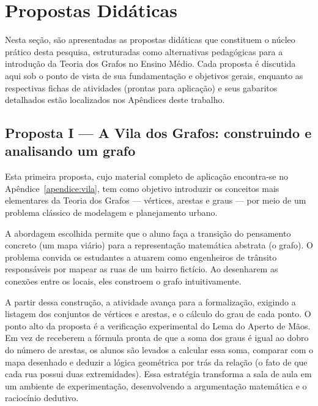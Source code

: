 \documentclass[
  12pt,
  oneside,
  a4paper,
  english,
  brazilian
  ]{abntex2}
\theoremstyle{definition}
\begin{document}
\section{Propostas Didáticas}
\label{sec:propostas_didaticas}

Nesta seção, são apresentadas as propostas didáticas que constituem o núcleo prático desta pesquisa, estruturadas como alternativas pedagógicas para a introdução da Teoria dos Grafos no Ensino Médio. Cada proposta é discutida aqui sob o ponto de vista de sua fundamentação e objetivos gerais, enquanto as respectivas fichas de atividades (prontas para aplicação) e seus gabaritos detalhados estão localizados nos Apêndices deste trabalho.

\subsection{Proposta I --- A Vila dos Grafos: construindo e analisando um grafo}
\label{sub:proposta_vila}

Esta primeira proposta, cujo material completo de aplicação encontra-se no Apêndice~\ref{apendice:vila}, tem como objetivo introduzir os conceitos mais elementares da Teoria dos Grafos --- vértices, arestas e graus --- por meio de um problema clássico de modelagem e planejamento urbano.

A abordagem escolhida permite que o aluno faça a transição do pensamento concreto (um mapa viário) para a representação matemática abstrata (o grafo). O problema convida os estudantes a atuarem como engenheiros de trânsito responsáveis por mapear as ruas de um bairro fictício. Ao desenharem as conexões entre os locais, eles constroem o grafo intuitivamente.

A partir dessa construção, a atividade avança para a formalização, exigindo a listagem dos conjuntos de vértices e arestas, e o cálculo do grau de cada ponto. O ponto alto da proposta é a verificação experimental do Lema do Aperto de Mãos. Em vez de receberem a fórmula pronta de que a soma dos graus é igual ao dobro do número de arestas, os alunos são levados a calcular essa soma, comparar com o mapa desenhado e deduzir a lógica geométrica por trás da relação (o fato de que cada rua possui duas extremidades). Essa estratégia transforma a sala de aula em um ambiente de experimentação, desenvolvendo a argumentação matemática e o raciocínio dedutivo.
\end{document}
